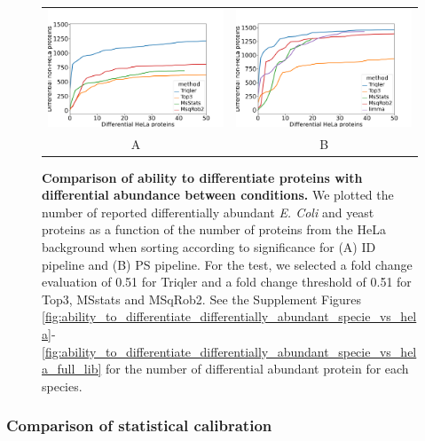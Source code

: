 \documentclass[10pt,letterpaper]{article}
\begin{document}
\begin{figure}[hbt]
    \centering
    \begin{tabular}{cc} 
        \includegraphics[width=0.45\linewidth]{../../result/report_plots_pipeline/diff_HeLa_vs_nonHeLa_ID_all_0.51.png} & 
        \includegraphics[width=0.45\linewidth]{../../result/report_plots_pipeline/diff_HeLa_vs_nonHeLa_PS_all_0.51_Limma.png}\\
        A & B 
    \end{tabular} 
    \caption{{\bf Comparison of ability to differentiate proteins with differential abundance between conditions.} We plotted the number of reported differentially abundant  {\em E. Coli} and yeast proteins as a function of the number of proteins from the HeLa background when sorting according to significance for (A) ID pipeline and (B) PS pipeline. For the test, we selected a fold change evaluation of 0.51 for Triqler and a fold change threshold of 0.51 for Top3, MSstats and MSqRob2. See the Supplement Figures \ref{fig:ability_to_differentiate_differentially_abundant_specie_vs_hela}-\ref{fig:ability_to_differentiate_differentially_abundant_specie_vs_hela_full_lib} for the number of differential abundant protein for each species. \label{fig:diff_vs_hela}}

\end{figure}

\subsubsection*{Comparison of statistical calibration}
\end{document}
